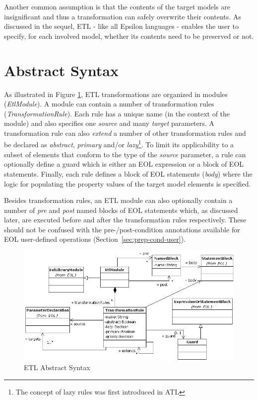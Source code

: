 Another common assumption is that the contents of the target models are insignificant and thus a transformation can safely overwrite their contents. As discussed in the sequel, ETL - like all Epsilon languages - enables the user to specify, for each involved model, whether its contents need to be preserved or not.

\section{Abstract Syntax}

As illustrated in Figure \ref{fig:EtlAbstractSyntax}, ETL transformations are organized in modules (\emph{EtlModule}). A module can contain a number of transformation rules (\emph{TransformationRule}). Each rule has a unique name (in the context of the module) and also specifies one \emph{source} and many \emph{target} parameters. A transformation rule can also \emph{extend} a number of other transformation rules and be declared as \emph{abstract}, \emph{primary} and/or \emph{lazy}\footnote{The concept of lazy rules was first introduced in ATL}. To limit its applicability to a subset of elements that conform to the type of the \emph{source} parameter, a rule can optionally define a guard which is either an EOL expression or a block of EOL statements. Finally, each rule defines a block of EOL statements (\emph{body}) where the logic for populating the property values of the target model elements is specified.

Besides transformation rules, an ETL module can also optionally contain a number of \emph{pre} and \emph{post} named blocks of EOL statements which, as discussed later, are executed before and after the transformation rules respectively. These should not be confused with the pre-/post-condition annotations available for EOL user-defined operations (Section~\ref{sec:prep-cond-user}).

\begin{figure}
	\centering
		\includegraphics{images/EtlAbstractSyntax.png}
	\caption{ETL Abstract Syntax}
	\label{fig:EtlAbstractSyntax}
\end{figure}


